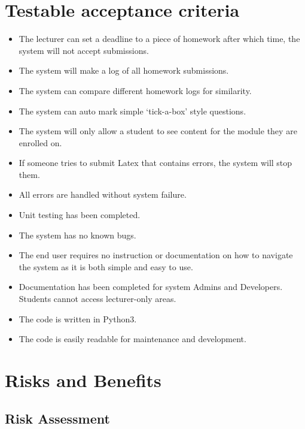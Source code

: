 \documentclass[12pt]{article}
\begin{document}
	\section{Testable acceptance criteria}
	\begin{itemize}
	\item The lecturer can set a deadline to a piece of homework after which time, the system will not accept submissions.
	\item The system will make a log of all homework submissions.
	\item The system can compare different homework logs for similarity.
	\item The system can auto mark simple ‘tick-a-box’ style questions.
	\item The system will only allow a student to see content for the module they are enrolled on.
	\item If someone tries to submit Latex that contains errors, the system will stop them.
	\item All errors are handled without system failure.
	\item Unit testing has been completed.
	\item The system has no known bugs.
	\item The end user requires no instruction or documentation on how to navigate the system as it is both simple and easy to use.
	\item Documentation has been completed for system Admins and Developers.
	Students cannot access lecturer-only areas.
	\item The code is written in Python3.
	\item The code is easily readable for maintenance and development.
	\end{itemize}
	

    \newpage
    
	\section{Risks and Benefits}
		\subsection{Risk Assessment}
			
			
\end{document}
